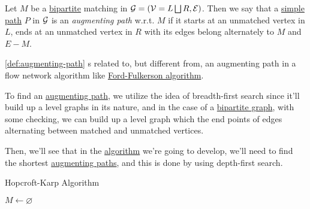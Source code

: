 \begin{definition}\label{def:augmenting-path}
	Let \(M\) be a \href{https://en.wikipedia.org/wiki/Bipartite_graph}{bipartite} matching in \(\mathcal{\MakeUppercase{g}} = (\mathcal{\MakeUppercase{v}} = L \bigsqcup  R, \mathcal{\MakeUppercase{E}})\).
	Then we say that a \hyperref[def:simple-path]{simple path} \(P\) in \(\mathcal{\MakeUppercase{g}} \) is an \emph{augmenting path} w.r.t. \(M\)
	if it starts at an unmatched vertex in \(L\), ends at an unmatched vertex in \(R\) with its edges belong alternately to \(M\) and \(E - M\).
\end{definition}

\begin{note}
	\autoref{def:augmenting-path} s related to, but different from, an augmenting path in a flow network algorithm like
	\href{https://en.wikipedia.org/wiki/Ford%E2%80%93Fulkerson_algorithm}{Ford-Fulkerson algorithm}.
\end{note}

\begin{intuition}
	To find an \hyperref[def:augmenting-path]{augmenting path}, we utilize the idea of breadth-first search since it'll build up a level graphs
	in its nature, and in the case of a \href{https://en.wikipedia.org/wiki/Bipartite_graph}{bipartite graph}, with some checking, we can
	build up a level graph which the end points of edges alternating between matched and unmatched vertices.
\end{intuition}

Then, we'll see that in the \hyperref[algo:Hopcroft-Karp-algorithm]{algorithm} we're going to develop, we'll need to find the
shortest \hyperref[def:augmenting-path]{augmenting paths}, and this is done by using depth-first search.


\par
\begin{algorithm}[H]\label{algo:Hopcroft-Karp-algorithm}
	\DontPrintSemicolon
	\caption{Hopcroft-Karp Algorithm}
	\BlankLine

	\(M\gets \varnothing \)
\end{algorithm}

